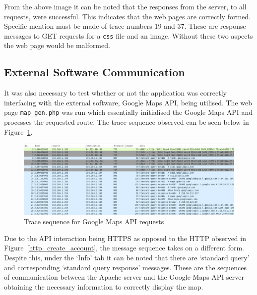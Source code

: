 \documentclass[10pt, a4paper, twocolumn]{scrartcl}
\begin{document}
		From the above image it can be noted that the responses from the server, to all requests, were successful. This indicates that the web pages are correctly formed. Specific mention must be made of trace numbers 19 and 37. These are response messages to GET requests for a \texttt{css} file and an image. Without these two aspects the web page would be malformed.
		
	\subsection{External Software Communication}
	
		It was also necessary to test whether or not the application was correctly interfacing with the external software, Google Maps API, being utilised. The web page \texttt{map\_gen.php} was run which essentially initialised the Google Maps API and processes the requested route. The trace sequence observed can be seen below in Figure~\ref{wireshark_google_maps}.\\
		
		\begin{figure}[h!]
			\centering
			\includegraphics[width = \textwidth]{../images/wireshark_google_maps.png}
			\caption{Trace sequence for Google Maps API requests}
			\label{wireshark_google_maps}
		\end{figure}
		
		Due to the API interaction being HTTPS as opposed to the HTTP observed in Figure~\ref{http_create_account}, the message sequence takes on a different form. Despite this, under the `Info' tab it can be noted that there are `standard query' and corresponding `standard query response' messages. These are the sequences of communication between the Apache server and the Google Maps API server obtaining the necessary information to correctly display the map.
\end{document}
